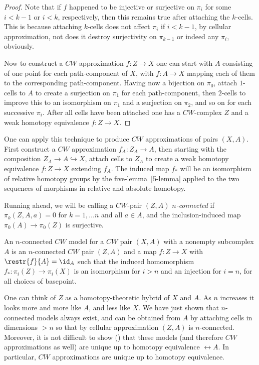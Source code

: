 \begin{proof}
    Note that if $f$ happened to be injective or surjective on $\pi_i$ for some $i<k-1$ or $i<k$, respectively, then this remains true after attaching the $k$-cells. This is because attaching $k$-cells does not affect $\pi_i$ if $i<k-1$, by cellular approximation, not does it destroy surjectivity on $\pi_{k-1}$ or indeed any $\pi_i$, obviously.

    Now to construct a $CW$ approximation $f:Z\to X$ one can start with $A$ consisting of one point for each path-component of $X$, with $f:A\to X$ mapping each of them to the corresponding path-component. Having now a bijection on $\pi_0$, attach $1$-cells to $A$ to create a surjection on $\pi_1$  for each path-component, then $2$-cells to improve this to an isomorphism on $\pi_1$ and a surjection on $\pi_2$, and so on for each successive $\pi_i$. After all cells have been attached one has a $CW$-complex $Z$ and a weak homotopy equivalence $f:Z\to X$.
\end{proof}

\begin{rem}
    One can apply this technique to produce $CW$ approximations of pairs $(X,A)$. First construct a $CW$ approximation $f_A:Z_A\to A$, then starting with the composition $Z_A\to A\hookrightarrow X$, attach cells to $Z_A$ to create a weak homotopy equivalence $f:Z\to X$ extending $f_A$. The induced map $f_\ast$ will be an isomorphism of relative homotopy groups  by the five-lemma~\ref{5-lemma} applied to the two sequences of morphisms in relative and absolute homotopy.
\end{rem}


Running ahead, we will be calling a $CW$-pair $(Z,A)$ \emph{$n$-connected} if $\pi_k(Z,A,a)=0$ for $k=1,\ldots n$ and all $a\in A$, and the inclusion-induced map $\pi_0(A)\to \pi_0(Z)$ is surjective. 

\begin{defn}
    An $n$-connected $CW$ model for a $CW$ pair $(X,A)$ with a nonempty subcomplex $A$ is an $n$-connected $CW$ pair $(Z,A)$ and a map $f:Z\to X$ with $\restr{f}{A}=\id_A$ such that the induced homomorphism $f_\ast:\pi_i(Z)\to \pi_i(X)$ is an isomorphism for $i>n$ and an injection for $i=n$, for all choices of basepoint.
\end{defn}

One can think of $Z$ as a homotopy-theoretic hybrid of $X$ and $A$. As $n$ increases it looks more and more like $A$, and less like $X$. We have just shown that $n$-connected models always exist, and can be obtained from $A$ by attaching cells in dimensions $>n$ so that by cellular approximation $(Z,A)$ is $n$-connected. Moreover, it is not difficult to show (\cite[Prop.~4.18, Cor.~4.19]{Hatcher}) that these models (and therefore $CW$ approximations as well) are unique up to homotopy equivalence $\rel A$. In particular, $CW$ approximations are unique up to homotopy equivalence.




